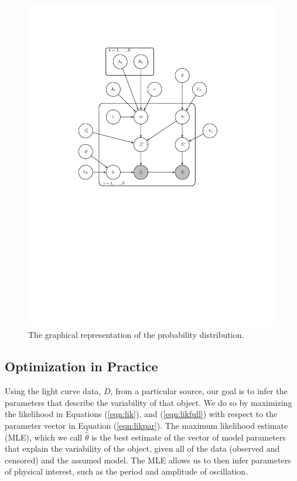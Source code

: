 \documentclass[12pt,preprint]{aastex}
\begin{document}
\begin{figure}[hbtp]
  \begin{center}
    \includegraphics[width=\textwidth,%
      trim=3cm 12cm 5cm 3cm, clip=true]{gm/gm.pdf}
  \end{center}
  \caption{The graphical representation of the probability distribution.
    \label{fig:graph}}
\end{figure}

\subsection{Optimization in Practice}
\label{ss:optim}

Using the light curve data, $D$, from a particular source, our goal is to infer the parameters that describe the variability of that object.  We do so by maximizing the likelihood in Equations (\ref{eqn:lik}), and (\ref{eqn:likfull}) with respect to the parameter vector in Equation (\ref{eqn:likpar}).  The maximum likelihood estimate (MLE), which we call $\widehat{\theta}$ is the best estimate of the vector of model parameters that explain the variability of the object, given all of the data (observed and censored) and the assumed model.  The MLE allows us to then infer parameters of physical interest, such as the period and amplitude of oscillation.
\end{document}
